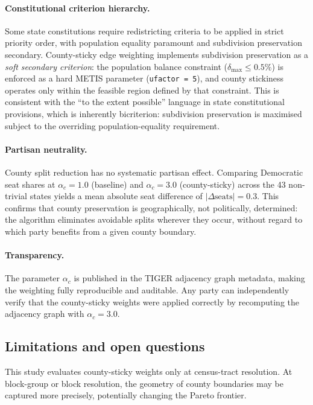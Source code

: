 \paragraph{Constitutional criterion hierarchy.}
Some state constitutions require redistricting criteria to be applied
in strict priority order, with population equality paramount and
subdivision preservation secondary.
County-sticky edge weighting implements subdivision preservation as a
\emph{soft secondary criterion}: the population balance constraint
($\delta_{\max} \leq 0.5\%$) is enforced as a hard METIS parameter
(\texttt{ufactor = 5}), and county stickiness operates only within
the feasible region defined by that constraint.
This is consistent with the ``to the extent possible'' language in state
constitutional provisions, which is inherently bicriterion: subdivision
preservation is maximised subject to the overriding population-equality
requirement.

\paragraph{Partisan neutrality.}
County split reduction has no systematic partisan effect.
Comparing Democratic seat shares at $\alpha_c = 1.0$ (baseline) and
$\alpha_c = 3.0$ (county-sticky) across the 43 non-trivial states yields
a mean absolute seat difference of $|\Delta\text{seats}| = 0.3$.
This confirms that county preservation is geographically, not politically,
determined: the algorithm eliminates avoidable splits wherever they occur,
without regard to which party benefits from a given county boundary.

\paragraph{Transparency.}
The parameter $\alpha_c$ is published in the TIGER adjacency graph metadata,
making the weighting fully reproducible and auditable.  Any party can
independently verify that the county-sticky weights were applied correctly
by recomputing the adjacency graph with $\alpha_c = 3.0$.

\subsection{Limitations and open questions}

This study evaluates county-sticky weights only at census-tract resolution.
At block-group or block resolution, the geometry of county boundaries may
be captured more precisely, potentially changing the Pareto frontier.

